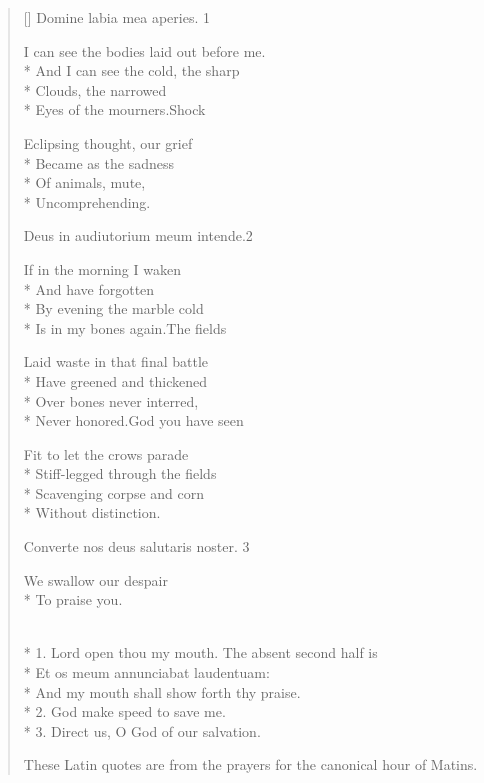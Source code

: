 \label{ch:lear_bt}
\settowidth{\versewidth}{These Latin quotes are from the prayers for the canonical hour of Matins.}
\begin{verse}[\versewidth]
Domine labia mea aperies. 1

I can see the bodies laid out before me.\\*
And I can see the cold, the sharp\\*
Clouds, the narrowed\\*
Eyes of the mourners.\qquad Shock

Eclipsing thought, our grief\\*
Became as the sadness\\*
Of animals, mute,\\*
Uncomprehending.

Deus in audiutorium meum intende.2

If in the morning I waken\\*
And have forgotten\\*
By evening the marble cold\\*
Is in my bones again.\qquad The fields

Laid waste in that final battle\\*
Have greened and thickened\\*
Over bones never interred,\\*
Never honored.\qquad God you have seen

Fit to let the crows parade\\*
Stiff-legged through the fields\\*
Scavenging corpse and corn\\*
Without distinction.

Converte nos deus salutaris noster. 3

We swallow our despair\\*
To praise you.

\\*
1. Lord open thou my mouth. The absent second half is\\*
   Et os meum annunciabat  laudentuam:\\*
   And my mouth shall show forth thy praise.\\*
2. God make speed to save me.\\*
3. Direct us, O God of our salvation.

These Latin quotes are from the prayers for the canonical hour of Matins.
\end{verse}
